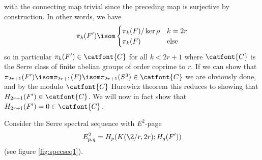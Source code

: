 \begin{solution}
\begin{equation*}
	\end{equation*}
	with the connecting map trivial since the preceding map is surjective by construction.
	In other words, we have
	\begin{equation*}
		\pi_k(F') \isom \begin{cases}
			\pi_k(F) / \ker \rho & k = 2r \\
			\pi_k(F) 			 & \text{else}
		\end{cases}
	\end{equation*}
	so in particular $\pi_k(F') \in \catfont{C}$ for all $k < 2r + 1$ where $\catfont{C}$ is the Serre class of finite abelian groups of order coprime to $r$.
	If we can show that $\pi_{2r + 1}(F') \isom \pi_{2r + 1}(F) \isom \pi_{2r + 1}(S^3) \in \catfont{C}$ we are obviously done, and by the modulo $\catfont{C}$ Hurewicz theorem this reduces to showing that $H_{2r + 1}(F') \in \catfont{C}$.
	We will now in fact show that $H_{2r + 1}(F') = 0 \in \catfont{C}$.

	Consider the Serre spectral sequence with $E^2$-page
	\begin{equation*}
		E^2_{p, q} = H_p(K(\Zn{r}, 2r); H_q(F'))
	\end{equation*}
	(see figure \ref{fig:specseq1}).
	\begin{figure}[ht]
		\centering
\end{figure}
\end{solution}
